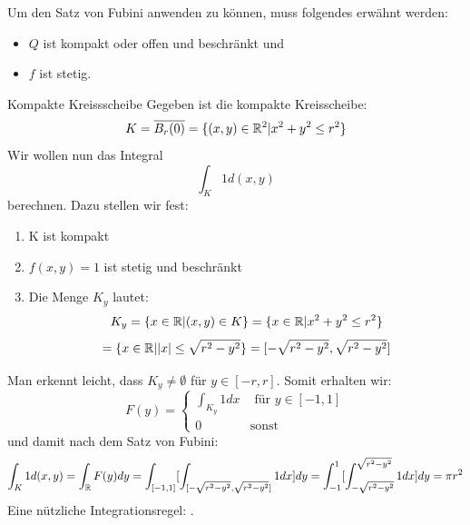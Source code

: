  Um den Satz von Fubini anwenden zu können, muss folgendes erwähnt werden:
\begin{itemize}
    \item $Q$ ist kompakt oder offen und beschränkt und
    \item $f$ ist stetig.
\end{itemize}
\begin{Beispiel}{Kompakte Kreissscheibe}
    Gegeben ist die kompakte Kreisscheibe:
    $$K=\overline{B_r(0)}=\{(x,y)\in\mathbb{R}^2| x^2+y^2\leq r^2\}$$
    Wir wollen nun das Integral
    $$\int_K 1 d(x,y)$$
    berechnen. Dazu stellen wir fest:
    \begin{enumerate}
        \item K ist kompakt
        \item $f(x,y)= 1$ ist stetig und beschränkt
        \item Die Menge $K_y$ lautet:
        $$K_y=\{x\in \mathbb{R}| (x,y)\in K\}=\{ x\in \mathbb{R} | x^2+y^2 \leq r^2\}$$
        $$= \{x\in \mathbb{R} | |x| \leq \sqrt{r^2-y^2}\}=[-\sqrt{r^2-y^2}, \sqrt{r^2-y^2}]$$
    \end{enumerate}
    Man erkennt leicht, dass $K_y\neq \emptyset$ für $y\in [-r, r]$. Somit erhalten wir:
    \begin{equation}
        F(y)=\begin{cases}\int_{K_y} 1dx & \mbox{ für $y\in [-1, 1]$} \\0 & \mbox{sonst}\end{cases}
    \end{equation}
    und damit nach dem Satz von Fubini:
    $$\int_K 1 d(x,y) = \int_{\mathbb{R}} F(y) dy = \int_{[-1,1]}[\int_{[-\sqrt{r^2-y^2}, \sqrt{r^2-y^2}]} 1dx]dy= \int_{-1}^{1} [\int_{-\sqrt{r^2-y^2}}^{\sqrt{r^2-y^2}} 1dx]dy=\pi r^2$$
    Eine nützliche Integrationsregel: .
\end{Beispiel}

